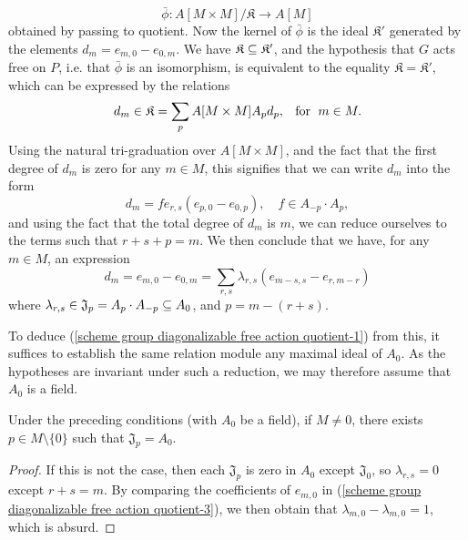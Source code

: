 \[\bar{\phi}:A[M\times M]/\mathfrak{K}\to A[M]\]
obtained by passing to quotient. Now the kernel of $\bar{\phi}$ is the ideal $\mathfrak{K}'$ generated by the elements $d_m=e_{m,0}-e_{0,m}$. We have $\mathfrak{K}\subseteq\mathfrak{K}'$, and the hypothesis that $G$ acts free on $P$, i.e. that $\bar{\phi}$ is an isomorphism, is equivalent to the equality $\mathfrak{K}=\mathfrak{K}'$, which can be expressed by the relations
\begin{equation}\label{scheme group diagonalizable free action quotient-2}
d_m\in\mathfrak{K}=\sum_pA[M\times M]A_pd_p,\hspace{8pt}\text{for}\hspace{6pt} m\in M.
\end{equation}
Using the natural tri-graduation over $A[M\times M]$, and the fact that the first degree of $d_m$ is zero for any $m\in M$, this signifies that we can write $d_m$ into the form
\[d_m=fe_{r,s}(e_{p,0}-e_{0,p}),\quad f\in A_{-p}\cdot A_p,\]
and using the fact that the total degree of $d_m$ is $m$, we can reduce ourselves to the terms such that $r+s+p=m$. We then conclude that we have, for any $m\in M$, an expression
\begin{equation}\label{scheme group diagonalizable free action quotient-3}
d_m=e_{m,0}-e_{0,m}=\sum_{r,s}\lambda_{r,s}(e_{m-s,s}-e_{r,m-r})
\end{equation}
where $\lambda_{r,s}\in\mathfrak{J}_p=A_p\cdot A_{-p}\subseteq A_0$, and $p=m-(r+s)$.\par
To deduce (\ref{scheme group diagonalizable free action quotient-1}) from this, it suffices to establish the same relation module any maximal ideal of $A_0$. As the hypotheses are invariant under such a reduction, we may therefore assume that $A_0$ is a field.

\begin{lemma}\label{scheme group diagonalizable free action quotient lemma-1}
Under the preceding conditions (with $A_0$ be a field), if $M\neq 0$, there exists $p\in M\setminus\{0\}$ such that $\mathfrak{J}_p=A_0$.
\end{lemma}
\begin{proof}
If this is not the case, then each $\mathfrak{J}_p$ is zero in $A_0$ except $\mathfrak{J}_0$, so $\lambda_{r,s}=0$ except $r+s=m$. By comparing the coefficients of $e_{m,0}$ in (\ref{scheme group diagonalizable free action quotient-3}), we then obtain that $\lambda_{m,0}-\lambda_{m,0}=1$, which is absurd.
\end{proof}

